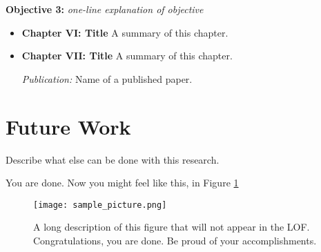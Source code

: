 \textbf{Objective 3:} \textit{one-line explanation of objective} 

\begin{itemize}
\item{\textbf{Chapter VI: Title} A summary of this chapter.}

\item{\textbf{Chapter VII: Title} A summary of this chapter.  

\begin{footnotesize}
\textit{Publication:}
Name of a published paper. \end{footnotesize}}

\end{itemize}

\section{Future Work}

Describe what else can be done with this research. 

You are done. Now you might feel like this, in Figure \ref{fig:picture_happy}

\begin{figure}[!ht]
	{\texttt{[image: sample\_picture.png]}} 
    \centering
  	\caption[A short description of this figure for the LOF]{A long description of this figure that will not appear in the LOF. Congratulations, you are done. Be proud of your accomplishments.} 
 	\label{fig:picture_happy}
\end{figure} 



\renewcommand{\thechapter}{\Roman{chapter}}